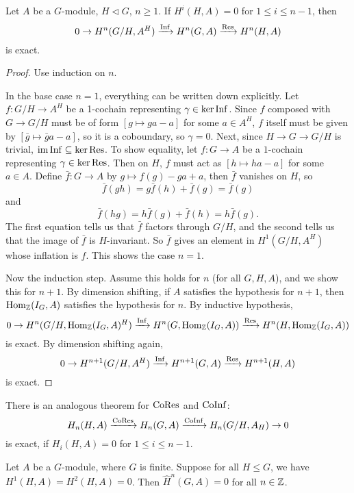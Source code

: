 \documentclass[11pt]{amsart}
\begin{document}
\begin{thm}
    Let $A$ be a $G$-module, $H\lhd G$, $n\ge 1$. If $H^i(H,A) = 0$ for $1\le i\le n-1$, then
    \[0\to H^n(G/H, A^H) \xrightarrow{\operatorname{Inf}} H^n(G,A) \xrightarrow{\operatorname{Res}} H^n(H,A)\]
    is exact.
\end{thm}

\begin{proof}
    Use induction on $n$. 
    
    In the base case $n=1$, everything can be written down explicitly. Let $f: G/H\to A^H$ be a 1-cochain representing $\gamma\in \ker\operatorname{Inf}$. Since $f$ composed with $G\to G/H$ must be of form $[g\mapsto ga-a]$ for some $a\in A^H$, $f$ itself must be given by $[\bar{g}\mapsto \bar{g}a-a]$, so it is a coboundary, so $\gamma = 0$. Next, since $H\to G\to G/H$ is trivial, $\operatorname{im} \operatorname{Inf} \subseteq \ker \operatorname{Res}$. To show equality, let $f: G\to A$ be a $1$-cochain representing $\gamma\in \ker\operatorname{Res}$. Then on $H$, $f$ must act as $[h\mapsto ha-a]$ for some $a\in A$. Define $\bar{f}: G\to A$ by $g\mapsto f(g)-ga+a$, then $\bar{f}$ vanishes on $H$, so
    \[\bar{f}(gh) = g\bar{f}(h) + \bar{f}(g) = \bar{f}(g)\]
    and
    \[\bar{f}(hg) = h\bar{f}(g) + \bar{f}(h) = h\bar{f}(g).\]
    The first equation tells us that $\bar{f}$ factors through $G/H$, and the second tells us that the image of $\bar{f}$ is $H$-invariant. So $\bar{f}$ gives an element in $H^1(G/H, A^H)$ whose inflation is $f$. This shows the case $n=1$.

    Now the induction step. Assume this holds for $n$ (for all $G,H,A$), and we show this for $n+1$. By dimension shifting, if $A$ satisfies the hypothesis for $n+1$, then $\operatorname{Hom}_{\mathbb{Z}}(I_G, A)$ satisfies the hypothesis for $n$. By inductive hypothesis, 
    \[0\to H^n(G/H, \operatorname{Hom}_{\mathbb{Z}}(I_G,A)^H) \xrightarrow{\operatorname{Inf}} H^n(G,\operatorname{Hom}_{\mathbb{Z}}(I_G,A)) \xrightarrow{\operatorname{Res}} H^n(H,\operatorname{Hom}_{\mathbb{Z}}(I_G,A))\]
    is exact. By dimension shifting again,
    \[0\to H^{n+1}(G/H, A^H) \xrightarrow{\operatorname{Inf}} H^{n+1}(G,A) \xrightarrow{\operatorname{Res}} H^{n+1}(H,A)\]
    is exact.
\end{proof}

\begin{Rem}
    There is an analogous theorem for $\operatorname{CoRes}$ and $\operatorname{CoInf}$:
    \[H_n(H,A) \xrightarrow{\operatorname{CoRes}} H_n(G,A) \xrightarrow{\operatorname{CoInf}} H_n(G/H, A_H) \to 0\]
    is exact, if $H_i(H,A) = 0$ for $1\le i\le n-1$.
\end{Rem}

\begin{thm}
    Let $A$ be a $G$-module, where $G$ is finite. Suppose for all $H\le G$, we have $H^1(H,A) = H^2(H,A) = 0$. Then $\hat{H}^n(G,A) = 0$ for all $n\in \mathbb{Z}$.
\end{thm}
\end{document}
